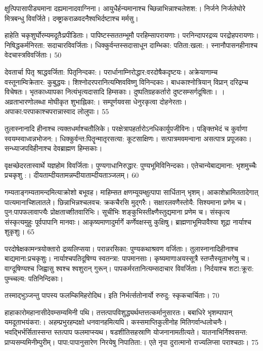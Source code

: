 क्षुत्पिपासापीड्यमाना दह्यमानादवाग्निना।
आयुधैर्हन्यमानाश्च च्छिन्नाभिन्नाश्चलेशश:।
निर्जने निर्जलेघोरे मित्रबन्धु विवर्जिते।
दम्ष्ट्राकराळवदनैश्वभिर्दष्टाश्च मर्मसु।


हाहेति चकृशुर्घोरम्यमदूतैःप्रपीडिताः।
पापिष्टस्सततम्भूमौ परहिम्सापरायणाः।
परनिन्दापरद्रव्य परद्रोहपरायणाः।
निषिद्धकर्मनिरता: सदाचारविवर्जिताः।
धिक्कुर्वन्तस्सदासाधून दाम्भिका: पतिता:खला:।
स्नानौपासनहीनाश्च वेदचास्त्रविवर्जिताः।
50

देवतार्चा पितृ श्राद्धवर्जिता: पितृनिन्दका:।
परार्धानाम्निरोद्धार:वरदोषैकदृष्टयः।
अक्रेयाणाम्च वस्तूनाम्विक्रेतार: कुबुद्धयः।
शिश्नोदरपरानित्यम्शिवविष्णु विनिन्दकाः।
बाधकाश्नोत्रियान् विप्रान् दरिद्रम्च विचेषतः।
भृतकाध्यापका नित्यंभृत्यदासादि हिम्सकाः।
दुष्पतिग्रहकर्तारो दुष्टसम्सर्गदूषिताः।
।
अव्रताभारणोलब्धा मोघीकृत शुभाह्निका:।
सम्पूर्णयवसा धेनुरकृत्वा दोहनेरताः।
अपाका:परपाकाश्चपरान्नास्वाद लोलुपाः।
55

तुलास्नानादि हीनाश्च त्यक्तधर्माश्चतौलिके।
परक्षेत्रापहर्तारोऽनधिकार्युपजीविनः।
पङ्क्तिभेदं च कुर्वाणा स्वयम्स्वाध्वन्नभोजन:।
धिक्कुर्वन्त:पितॄन्मातृरसत्या: कूटसाक्षिणः।
सत्पात्रमवमन्वाना असत्पात्र प्रपूजकाः।
सन्ध्याजपविहीनाश्च देवब्राह्मण हिम्सकाः।


वृक्षच्छेदरतास्वार्थे यज्ञहोम विवर्जिताः।
पुण्यगाधानिरुद्धार: पुण्यभूमिविनिन्दकाः।
एतेचान्येबाद्यमाना: भृशमुच्चैः प्रचकृशु :।
दीयताम्दीयतामन्नम्दीयाताम्दीयताञ्जलम्।
60

गम्यताङ्गम्यतामन्दमित्याक्रोशो बभूवह।
माहिम्सत क्षणम्यूयम्क्षुत्पापा सार्धितान् भृशम्।
आकाशेभ्रामिततादेगात् पात्यमानाच्शिलातले।
छिन्नाभिन्नश्चलवच: क्रकचैरसि मुद्गरैः।
सक्षारलवणैस्तोयै: सिश्यमाना प्रणेम च।
पुन:पापफलावाप्त्यैः प्रोक्षताच्शीतवारिभिः।
सूचीभिः शङ्कुभिस्तीक्ष्णैस्तुद्यमाना प्रणेम च।
संस्कृत्य संस्कृत्यमुहुः पूर्वपापानि मानवाः।
आकृष्यमाणादुर्मार्गे कर्णेवक्षस्सु कुक्षिषु।
ब्राह्मणाभूमिपावैश्या शूद्रा नार्याश्च शुकृशुः।
65

परदोषेक्षकामन्त्रयोक्तारो द्रव्यलिप्सया।
परान्नरसिका: पुण्यकथाश्रवण वर्जिताः।
तुलास्नानादिहीनाश्च बाद्यमाना:प्रचकृशुः।
नार्याश्चपतिदूषिण्य स्वतन्त्रा: पापमानसाः।
कृष्यमाणाअयस्सूत्रै स्तप्त्तैस्यूताभगेषु च।
वाग्दूषिण्यश्च जिह्वासु श्वश्च श्वशुरान् गुरून्।
पापकर्मरतानित्यम्सदाचार विवर्जिताः।
निर्दयाश्च शटा:क्रूरा: पुम्च्चल्य: पतिनिन्दिकाः।


तस्माद्भुञ्जन्तु पापस्य फलम्किमिहरोदिथ।
इति निर्भर्त्सतोनार्यो रुरुदु: स्कृकचार्चिताः।
70

हाहाकारोमहानासीदेवम्सम्यमिनी पथि।
तत्तत्पापविशुद्ध्यर्थम्तत्तत्कर्मानुसारतः।
बबाधिरे भृशम्पापान् यमदूताभयंकरा:।
अहम्प्रभुरहम्दक्षो धनवानहमित्यपि।
कस्समाप्तिकुलीनोह मितिगर्वान्धलोचनैः।
भवद्भिर्भर्सितास्सन्त स्तत्पाप फलमाप्स्यथ।
षडशीतिसहस्राणि योजनानामतीत्यते।
यातनाभिर्निश्वसन्त: प्राप्यसम्यमिनीम्पुरीम्।
पापा:पापानुसारेण निरयेषु निपातिता:।
एते नृपा दुरात्मानो राज्यलिप्सा पराश्चठाः।
75

